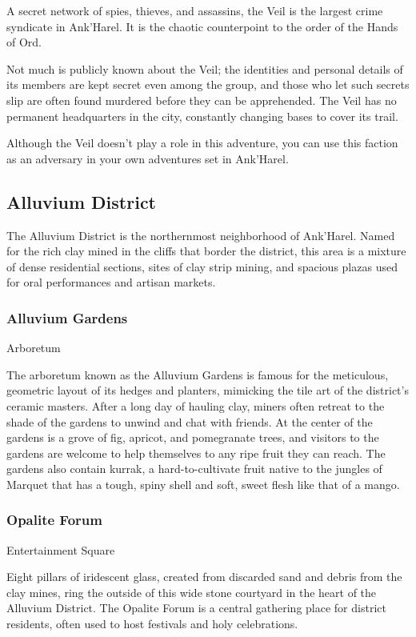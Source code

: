 \documentclass[10pt,a4paper,twoside,bg=print,twocolumn,openany,nodeprecatedcode]{dndbook}
\begin{document}
A secret network of spies, thieves, and assassins, the Veil is the largest crime syndicate in Ank'Harel. It is the chaotic counterpoint to the order of the Hands of Ord.

Not much is publicly known about the Veil; the identities and personal details of its members are kept secret even among the group, and those who let such secrets slip are often found murdered before they can be apprehended. The Veil has no permanent headquarters in the city, constantly changing bases to cover its trail.

Although the Veil doesn't play a role in this adventure, you can use this faction as an adversary in your own adventures set in Ank'Harel.

\subsection{Alluvium District}
The Alluvium District is the northernmost neighborhood of Ank'Harel. Named for the rich clay mined in the cliffs that border the district, this area is a mixture of dense residential sections, sites of clay strip mining, and spacious plazas used for oral performances and artisan markets.


\subsubsection{Alluvium Gardens}
Arboretum

The arboretum known as the Alluvium Gardens is famous for the meticulous, geometric layout of its hedges and planters, mimicking the tile art of the district's ceramic masters. After a long day of hauling clay, miners often retreat to the shade of the gardens to unwind and chat with friends. At the center of the gardens is a grove of fig, apricot, and pomegranate trees, and visitors to the gardens are welcome to help themselves to any ripe fruit they can reach. The gardens also contain kurrak, a hard-to-cultivate fruit native to the jungles of Marquet that has a tough, spiny shell and soft, sweet flesh like that of a mango.

\subsubsection{Opalite Forum}
Entertainment Square

Eight pillars of iridescent glass, created from discarded sand and debris from the clay mines, ring the outside of this wide stone courtyard in the heart of the Alluvium District. The Opalite Forum is a central gathering place for district residents, often used to host festivals and holy celebrations.
\end{document}
